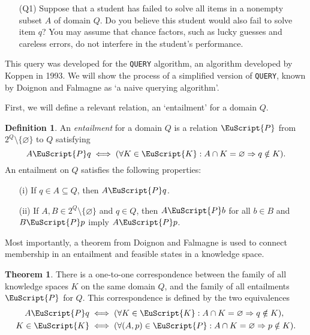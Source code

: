 \documentclass[11pt,letterpaper,dvipsnames]{article}
\theoremstyle{definition}
\newtheorem{definition}{Definition}[section]
\newtheorem{theorem}{Theorem}[section]
\newcommand{\es}[1]{\EuScript{#1}}
\begin{document}
\begin{enumerate}
    \item[(Q1)] Suppose that a student has failed to solve all items in a nonempty subset $A$ of domain $Q$. Do you believe this student would also fail to solve item $q$? You may assume that chance factors, such as lucky guesses and careless errors, do not interfere in the student's performance.
\end{enumerate}

This query was developed for the \texttt{QUERY} algorithm, an algorithm developed by Koppen in 1993. We will show the process of a simplified version of \texttt{QUERY}, known by Doignon and Falmagne as `a naive querying algorithm'.

First, we will define a relevant relation, an `entailment' for a domain $Q$.

\begin{definition}
    An \textit{entailment} for a domain $Q$ is a relation $\es{P}$ from $2^Q\setminus\{\varnothing\}$ to $Q$ satisfying
    \[
        A\es{P}q \iff (\forall K\in \es{K} : A \cap K = \varnothing \Rightarrow q \notin K).
    \]
    An entailment on $Q$ satisfies the following properties:
    \begin{enumerate}
        \item[(i)] If $q\in A\subseteq Q$, then $A\es{P}q$.
        \item[(ii)] If $A,B\in 2^Q\setminus\{\varnothing\}$ and $q\in Q$, then $A\es{P}b$ for all $b\in B$ and $B\es{P}p$ imply $A\es{P}p$.
    \end{enumerate}
\end{definition}

Most importantly, a theorem from Doignon and Falmagne is used to connect membership in an entailment and feasible states in a knowledge space.

\begin{theorem}
    There is a one-to-one correspondence between the family of all knowledge spaces $K$ on the same domain $Q$, and the family of all entailments $\es{P}$ for $Q$. This correspondence is defined by the two equivalences
    \begin{align}
        A \es{P} q &\iff (\forall K\in \es{K} : A \cap K = \varnothing \Rightarrow q \notin K), \\
        K\in \es{K} &\iff (\forall(A,p)\in\es{P}: A \cap K = \varnothing \Rightarrow p \notin K).
    \end{align}
\end{theorem}
\end{document}
